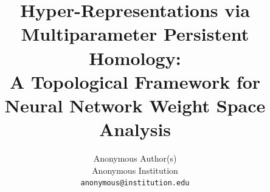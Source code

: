 \documentclass[10pt,twocolumn,letterpaper]{article}
\title{Hyper-Representations via Multiparameter Persistent Homology: \\
A Topological Framework for Neural Network Weight Space Analysis}
\author{Anonymous Author(s)\\
Anonymous Institution\\
{\tt\small anonymous@institution.edu}
}
\begin{document}
\maketitle
    






{
    \small
    
    
}

% 
\end{document}
